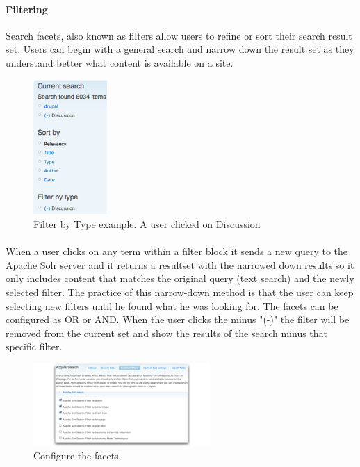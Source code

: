 \paragraph{Filtering}
Search facets, also known as filters allow users to refine or sort their search result set. Users can begin with a general search and narrow down the result set as they understand better what content is available on a site.

\begin{figure}
\begin{center}
     \includegraphics[width=0.25\textwidth]{images/Search_facet_ex_4_by-type-ex-1.png}
     \caption{Filter by Type example. A user clicked on Discussion}\end{center}
\end{figure}
\paragraph{}
When a user clicks on any term within a filter block it sends a new query to the Apache Solr server and it returns a resultset with the narrowed down results so it only includes content that matches the original query (text search) and the newly selected filter. 
The practice of this narrow-down method is that the user can keep selecting new filters until he found what he was looking for. The facets can be configured as OR or AND. When the user clicks the minus "(-)" the filter will be removed from the current set and show the results of the search minus that specific filter.

\begin{figure}
\begin{center}
\includegraphics[width=0.60\textwidth]{images/enabled_search_filters_page-1.png}
\caption{Configure the facets}
\end{center}
\end{figure}

